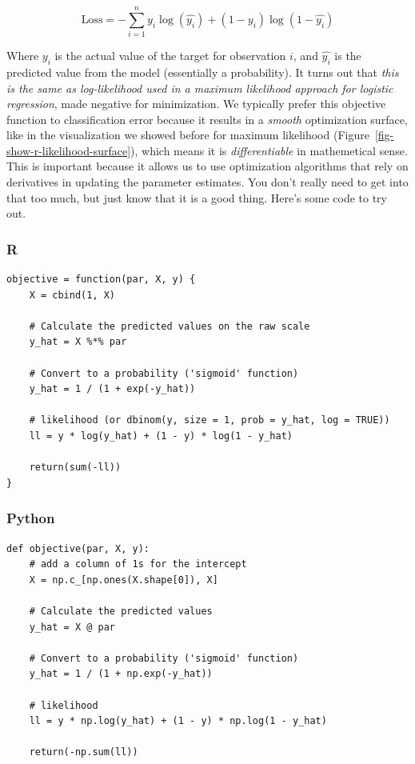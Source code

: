 \documentclass[
  letterpaper,
]{krantz}
\begin{document}
\[
\textrm{Loss} = -\sum_{i=1}^{n} y_i \log(\hat{y_i}) + (1 - y_i) \log(1 - \hat{y_i})
\]

Where \(y_i\) is the actual value of the target for observation \(i\),
and \(\hat{y_i}\) is the predicted value from the model (essentially a
probability). It turns out that \emph{this is the same as log-likelihood
used in a maximum likelihood approach for logistic regression}, made
negative for minimization. We typically prefer this objective function
to classification error because it results in a \emph{smooth}
optimization surface, like in the visualization we showed before for
maximum likelihood (Figure~\ref{fig-show-r-likelihood-surface}), which
means it is \emph{differentiable} in mathemetical sense. This is
important because it allows us to use optimization algorithms that rely
on derivatives in updating the parameter estimates. You don't really
need to get into that too much, but just know that it is a good thing.
Here's some code to try out.

\subsubsection{R}

\begin{verbatim}
objective = function(par, X, y) {
    X = cbind(1, X)

    # Calculate the predicted values on the raw scale
    y_hat = X %*% par

    # Convert to a probability ('sigmoid' function)
    y_hat = 1 / (1 + exp(-y_hat))

    # likelihood (or dbinom(y, size = 1, prob = y_hat, log = TRUE))
    ll = y * log(y_hat) + (1 - y) * log(1 - y_hat)

    return(sum(-ll))
}
\end{verbatim}

\subsubsection{Python}

\begin{verbatim}
def objective(par, X, y):
    # add a column of 1s for the intercept
    X = np.c_[np.ones(X.shape[0]), X]

    # Calculate the predicted values
    y_hat = X @ par
    
    # Convert to a probability ('sigmoid' function)
    y_hat = 1 / (1 + np.exp(-y_hat))
    
    # likelihood
    ll = y * np.log(y_hat) + (1 - y) * np.log(1 - y_hat)
    
    return(-np.sum(ll))
\end{verbatim}
\end{document}
